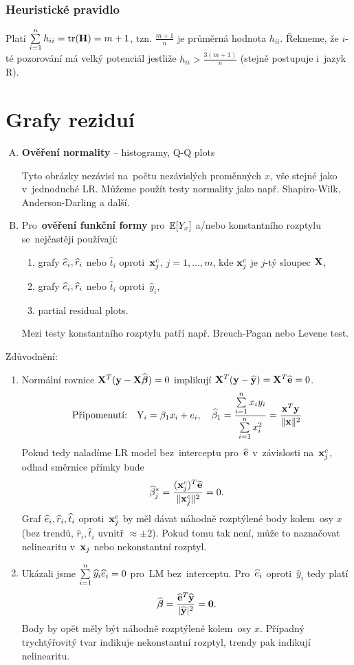 \subsubsection{Heuristické pravidlo}
Platí $\sum\limits_{i=1}^{n} h_{ii} = \text{tr}(\textbf{H}) = m + 1$, tzn. $\frac{m+1}{n}$ je průměrná hodnota $h_{ii}$. Řekneme, že $i$-té pozorování má velký potenciál jestliže $h_{ii} > \frac{3(m+1)}{n}$ (stejně postupuje i~jazyk R).

\section{Grafy reziduí}
\begin{enumerate}[A)]
\item \textbf{Ověření normality} -- histogramy, Q-Q plots

Tyto obrázky nezávisí na~počtu nezávislých proměnných $x$, vše stejné jako v~jednoduché LR. Můžeme použít testy normality jako např. Shapiro-Wilk, Anderson-Darling a další.
\item Pro~\textbf{ověření funkční formy} pro~$\mathbb{E} [Y_x]$ a/nebo konstantního rozptylu se~nejčastěji používají:
\begin{enumerate}[1)]
\item grafy $\widehat{e}_i, \widehat{r}_i$ nebo $\widehat{t}_i$ oproti~$\mathbf{x}_j^c$, $j = 1,\dots, m$, kde $\mathbf{x}_j^c$ je $j$-tý sloupec $\mathbf{X}$,
\item grafy $\widehat{e}_i, \widehat{r}_i$ nebo $\widehat{t}_i$ oproti~$\widehat{y}_i$,
\item partial residual plots.
\end{enumerate}
Mezi testy konstantního rozptylu patří např. Breuch-Pagan nebo Levene test.
\end{enumerate}

\begin{remark}
Zdůvodnění:
\begin{enumerate}
\item Normální rovnice $\mathbf{X}^T (\mathbf{y} - \mathbf{X} \widehat{\boldsymbol{\beta}}) = 0$ implikují $\mathbf{X}^T (\mathbf{y} - \widehat{\mathbf{y}}) = \mathbf{X}^T \widehat{\mathbf{e}} = 0$.
 $$
 \text{Připomenutí:} \quad \text{Y}_i = \beta_1 x_i + e_i, \quad \widehat{\beta}_1 = \frac{\sum\limits_{i=1}^{n} x_i y_i}{\sum\limits_{i=1}^{n} x_i^2} = \frac{\mathbf{x}^T\mathbf{y}}{\| \mathbf{x} \|^2 }
 $$
Pokud tedy naladíme LR model bez~interceptu pro~$\widehat{\mathbf{e}}$ v~závislosti na~$\mathbf{x}_j^c$, odhad směrnice přímky bude
 $$
  \widehat{\beta}_j^* = \frac{(\mathbf{x}_j^c)^T \widehat{\mathbf{e}}}{\| \mathbf{x}_j^c \|^2} = 0.
 $$
Graf $\widehat{e}_i, \widehat{r}_i, \widehat{t}_i$ oproti~$\mathbf{x}_j^c$ by měl dávat náhodně rozptýlené body kolem~osy $x$ (bez trendů, $\widehat{r}_i, \widehat{t}_i$ uvnitř $\approx \pm 2$).
Pokud tomu tak není, může to naznačovat nelinearitu v~$\mathbf{x}_j$ nebo nekonstantní rozptyl.
\item Ukázali jsme $\sum\limits_{i=1}^{n} \widehat{y}_i \widehat{e}_i = 0$ pro~LM bez~interceptu. Pro~$\widehat{e}_i$ oproti~$\widehat{y}_i$ tedy platí
 $$
  \widehat{\boldsymbol{\beta}} = \frac{\widehat{\mathbf{e}}^T \widehat{\mathbf{y}}}{| \widehat{\mathbf{y}} |^2} = \boldsymbol{0}.
 $$
Body by opět měly být náhodně rozptýlené kolem~osy $x$. Případný trychtýřovitý tvar indikuje nekonstantní rozptyl, trendy pak indikují nelinearitu.
\end{enumerate}	
\end{remark}

